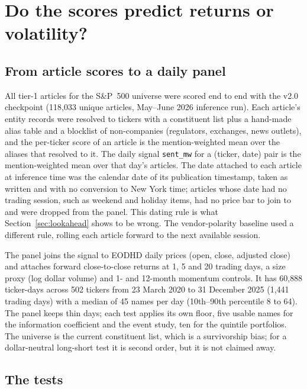 \documentclass[11pt,letterpaper]{article}
\newcommand{\code}[1]{\texttt{#1}}
\begin{document}
\section{Do the scores predict returns or volatility?}
\label{sec:signal}

\subsection{From article scores to a daily panel}

All tier-1 articles for the S\&P~500 universe were scored end to end with the v2.0 checkpoint
(118{,}033 unique articles, May--June 2026 inference run). Each article's entity records were
resolved to tickers with a constituent list plus a hand-made alias table and a blocklist of
non-companies (regulators, exchanges, news outlets), and the per-ticker score of an article is the
mention-weighted mean over the aliases that resolved to it. The daily signal \code{sent\_mw} for a
(ticker, date) pair is the mention-weighted mean over that day's articles. The date attached to
each article at inference time was the calendar date of its publication timestamp, taken as
written and with no conversion to New York time; articles whose date had no trading session, such
as weekend and holiday items, had no price bar to join to and were dropped from the panel. This
dating rule is what Section~\ref{sec:lookahead} shows to be wrong. The vendor-polarity baseline
used a different rule, rolling each article forward to the next available session.

The panel joins the signal to EODHD daily prices (open, close, adjusted close) and attaches
forward close-to-close returns at 1, 5 and 20 trading days, a size proxy (log dollar volume) and
1- and 12-month momentum controls. It has 60{,}888 ticker-days across 502 tickers from
23 March 2020 to 31 December 2025 (1{,}441 trading days) with a median of 45 names per day
(10th--90th percentile 8 to 64). The panel keeps thin days; each test applies its own floor, five
usable names for the information coefficient and the event study, ten for the quintile
portfolios. The universe is the current constituent list, which is a survivorship bias; for a
dollar-neutral long-short test it is second order, but it is not claimed away.

\subsection{The tests}
\end{document}
